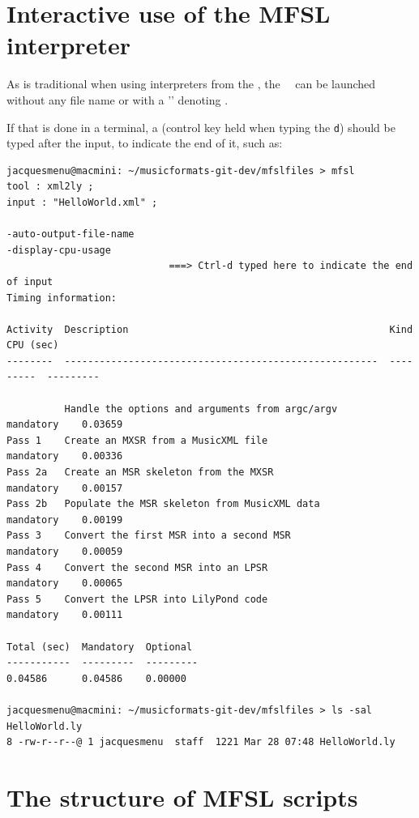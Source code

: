 \section{Interactive use of the MFSL interpreter}

As is traditional when using interpreters from the \CLI, the \mfslInterp\ \mfslExec\ can be launched without any file name or with a '\code{-}' denoting \standardInput.

If that is done in a terminal, a  (control key held when typing the {\tt d}) should be typed after the input, to indicate the end of it, such as:
\begin{lstlisting}[language=Terminal]
jacquesmenu@macmini: ~/musicformats-git-dev/mfslfiles > mfsl
tool : xml2ly ;
input : "HelloWorld.xml" ;

-auto-output-file-name
-display-cpu-usage
							===> Ctrl-d typed here to indicate the end of input
Timing information:

Activity  Description                                             Kind       CPU (sec)
--------  ------------------------------------------------------  ---------  ---------

          Handle the options and arguments from argc/argv         mandatory    0.03659
Pass 1    Create an MXSR from a MusicXML file                  mandatory    0.00336
Pass 2a   Create an MSR skeleton from the MXSR                    mandatory    0.00157
Pass 2b   Populate the MSR skeleton from MusicXML data            mandatory    0.00199
Pass 3    Convert the first MSR into a second MSR                 mandatory    0.00059
Pass 4    Convert the second MSR into an LPSR                     mandatory    0.00065
Pass 5    Convert the LPSR into LilyPond code                 mandatory    0.00111

Total (sec)  Mandatory  Optional
-----------  ---------  ---------
0.04586      0.04586    0.00000

jacquesmenu@macmini: ~/musicformats-git-dev/mfslfiles > ls -sal HelloWorld.ly
8 -rw-r--r--@ 1 jacquesmenu  staff  1221 Mar 28 07:48 HelloWorld.ly
\end{lstlisting}


\section{The structure of MFSL scripts}

